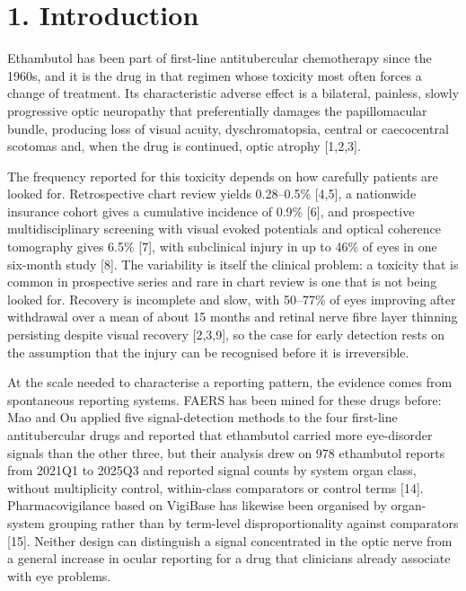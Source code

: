 \documentclass[12pt,a4paper]{article}
\begin{document}
\bigskip

\section*{1. Introduction}

Ethambutol has been part of first-line antitubercular chemotherapy since the 1960s, and it is the drug in that regimen whose toxicity most often forces a change of treatment. Its characteristic adverse effect is a bilateral, painless, slowly progressive optic neuropathy that preferentially damages the papillomacular bundle, producing loss of visual acuity, dyschromatopsia, central or caecocentral scotomas and, when the drug is continued, optic atrophy [1,2,3].

The frequency reported for this toxicity depends on how carefully patients are looked for. Retrospective chart review yields 0.28–0.5\% [4,5], a nationwide insurance cohort gives a cumulative incidence of 0.9\% [6], and prospective multidisciplinary screening with visual evoked potentials and optical coherence tomography gives 6.5\% [7], with subclinical injury in up to 46\% of eyes in one six-month study [8]. The variability is itself the clinical problem: a toxicity that is common in prospective series and rare in chart review is one that is not being looked for. Recovery is incomplete and slow, with 50–77\% of eyes improving after withdrawal over a mean of about 15 months and retinal nerve fibre layer thinning persisting despite visual recovery [2,3,9], so the case for early detection rests on the assumption that the injury can be recognised before it is irreversible.

At the scale needed to characterise a reporting pattern, the evidence comes from spontaneous reporting systems. FAERS has been mined for these drugs before: Mao and Ou applied five signal-detection methods to the four first-line antitubercular drugs and reported that ethambutol carried more eye-disorder signals than the other three, but their analysis drew on 978 ethambutol reports from 2021Q1 to 2025Q3 and reported signal counts by system organ class, without multiplicity control, within-class comparators or control terms [14]. Pharmacovigilance based on VigiBase has likewise been organised by organ-system grouping rather than by term-level disproportionality against comparators [15]. Neither design can distinguish a signal concentrated in the optic nerve from a general increase in ocular reporting for a drug that clinicians already associate with eye problems.
\end{document}

